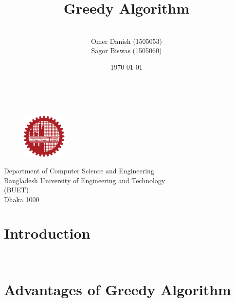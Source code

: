 \documentclass{article}
\title{\Huge{\textbf{Greedy Algorithm}}}
\author{~~\\Omer Danish (1505053) \\Sagor Biswas (1505060) }
\date{}
\begin{document}
\maketitle

~~~ \newline ~~~\newline ~~~\newline ~~~ \newline ~~~\newline ~~~\newline ~~~ \newline ~~~\newline 

\begin{figure}[h]       
    \centering
    \includegraphics[width =0.2\textwidth]{Subs/logo.png}
\end{figure}

\begin{center}
    \begin{Large}
        Department of Computer Science and Engineering \\
         Bangladesh University of Engineering and Technology \\(BUET)
         \\ Dhaka 1000 \\  \date{\today}
    \end{Large}
\end{center}

\newpage
\tableofcontents
\newpage

\maketitle

\section{Introduction}



~~~~~~~~\\ 

\section{ Advantages of Greedy Algorithm}
\end{document}
